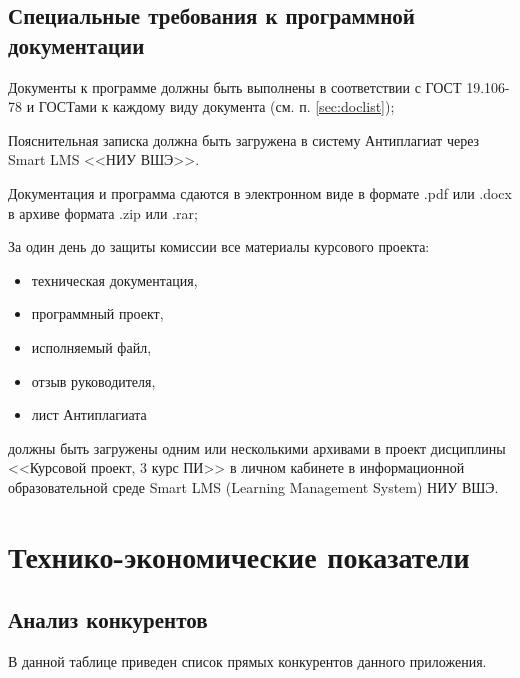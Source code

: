 \documentclass[a4paper,12pt,reqno]{article}
\begin{document}
  \subsection{Специальные требования к программной документации}
  \label{sec:smartlms}
  Документы к программе должны быть выполнены в соответствии с ГОСТ 19.106-78 и ГОСТами к каждому виду документа (см. п. \ref{sec:doclist});

  Пояснительная записка должна быть загружена в систему Антиплагиат через Smart LMS <<НИУ ВШЭ>>.

  Документация и программа сдаются в электронном виде в формате .pdf или .docx в архиве формата .zip или .rar;

  За один день до защиты комиссии все материалы курсового проекта:
  \begin{itemize}
    \item техническая документация,
    \item программный проект,
    \item исполняемый файл,
    \item отзыв руководителя,
    \item лист Антиплагиата
  \end{itemize}
  должны быть загружены одним или несколькими архивами в проект дисциплины <<Курсовой проект, 3 курс ПИ>> в личном кабинете в информационной образовательной среде Smart LMS (Learning Management System) НИУ ВШЭ.


  \newpage
  \section{Технико-экономические показатели}
  \subsection{Анализ конкурентов}
  В данной таблице приведен список прямых конкурентов данного приложения.
\end{document}
